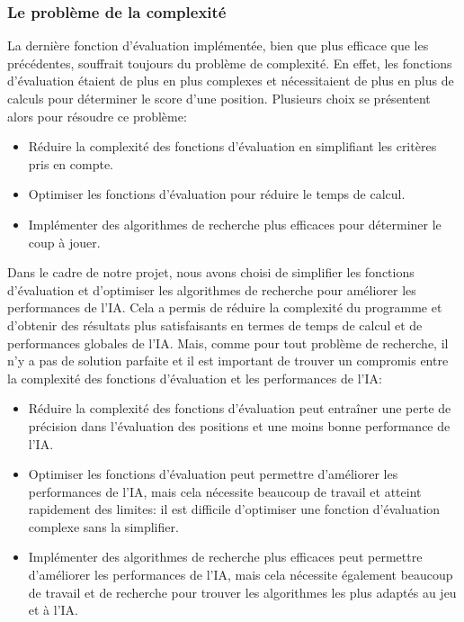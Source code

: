\subsubsection{Le problème de la complexité}
La dernière fonction d'évaluation implémentée, bien que plus efficace que les précédentes, souffrait toujours du problème
de complexité. En effet, les fonctions d'évaluation étaient de plus en plus complexes et nécessitaient de plus en plus de
calculs pour déterminer le score d'une position. Plusieurs choix se présentent alors pour résoudre ce problème:
\begin{itemize}
    \item Réduire la complexité des fonctions d'évaluation en simplifiant les critères pris en compte.
    \item Optimiser les fonctions d'évaluation pour réduire le temps de calcul.
    \item Implémenter des algorithmes de recherche plus efficaces pour déterminer le coup à jouer.
\end{itemize}
Dans le cadre de notre projet, nous avons choisi de simplifier les fonctions d'évaluation et d'optimiser les algorithmes
de recherche pour améliorer les performances de l'IA.
Cela a permis de réduire la complexité du programme et d'obtenir des résultats plus satisfaisants en termes de temps de 
calcul et de performances globales de l'IA.
Mais, comme pour tout problème de recherche, il n'y a pas de solution parfaite et il est important 
de trouver un compromis entre la complexité des fonctions d'évaluation et les performances de l'IA:
\begin{itemize}
    \item Réduire la complexité des fonctions d'évaluation peut entraîner une perte de précision dans l'évaluation des positions
    et une moins bonne performance de l'IA.
    \item Optimiser les fonctions d'évaluation peut permettre d'améliorer les performances de l'IA, mais cela nécessite
    beaucoup de travail et atteint rapidement des limites: il est difficile d'optimiser une fonction d'évaluation
    complexe sans la simplifier.
    \item Implémenter des algorithmes de recherche plus efficaces peut permettre d'améliorer les performances de l'IA,
    mais cela nécessite également beaucoup de travail et de recherche pour trouver les algorithmes les plus adaptés
    au jeu et à l'IA.
\end{itemize}

